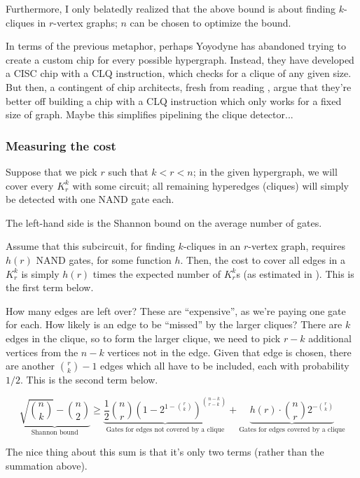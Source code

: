 \documentclass[12pt]{article}
\theoremstyle{definition}
\begin{document}
Furthermore, I only belatedly realized that the above bound is about
finding $k$-cliques in $r$-vertex graphs; $n$ can be chosen to optimize the
bound.

In terms of the previous metaphor, perhaps Yoyodyne has abandoned trying to
create a custom chip for every possible hypergraph. Instead, they have
developed a CISC chip
with a CLQ instruction, which checks for a clique
of any given size. But then, a contingent of chip architects, fresh from
reading \cite{hennessy2011computer}, argue that they're better off building
a chip with a CLQ instruction which only works for a fixed size of graph.
Maybe this simplifies pipelining the clique detector...

\subsubsection{Measuring the cost}

Suppose that we pick $r$ such that $k < r < n$; in the given hypergraph,
we will cover every $K_r^k$ with some circuit; all remaining hyperedges
(cliques) will simply be detected with one NAND gate each.

The left-hand side is the Shannon bound on the average number
of gates.

Assume that this subcircuit, for finding $k$-cliques in an $r$-vertex graph,
requires $h(r)$ NAND gates, for some
function $h$. Then,
the cost to cover all edges in a $K_r^k$ is simply $h(r)$ times the
expected number of $K_r^k$s (as estimated in \cite{bollobas1976cliques}).
This is the first term below.

How many edges are left over? These are ``expensive'', as we're
paying one gate for each. How likely is an edge to be ``missed''
by the larger cliques? There are $k$ edges in the clique, so to form
the larger clique, we need to pick $r-k$ additional vertices from
the $n-k$ vertices not in the edge. Given that edge is chosen, there
are another ${r \choose k} - 1$ edges which all have to be included,
each with probability $1/2$.
This is the second term below.

\[
\underbrace{\sqrt{n \choose k} - {n \choose 2}}_\text{Shannon bound}
\ge
\underbrace{\frac{1}{2} {n \choose r} (1 - 2^{1-{r \choose k}}) ^ {n-k \choose r-k}}
_\text{Gates for edges not covered by a clique}
   + \underbrace{h(r) \cdot {n \choose r} 2^{-{r \choose k}}}
_\text{Gates for edges covered by a clique}
\]

The nice thing about this sum is that it's only two terms (rather than
the summation above).
\end{document}
